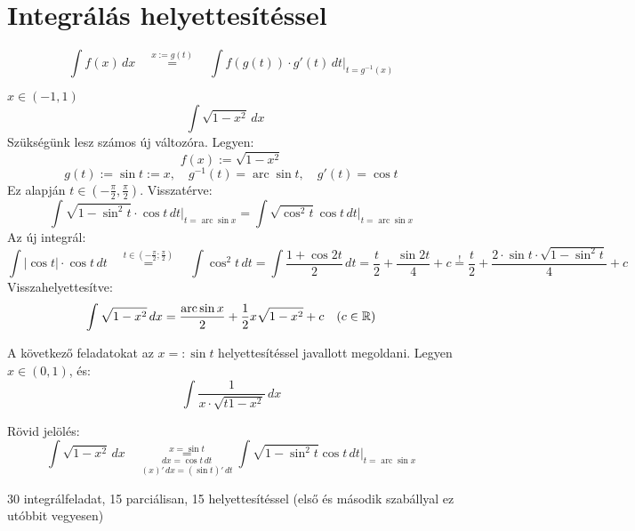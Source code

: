 \documentclass[a4paper,11.5pt]{article}
\DeclareMathOperator{\arc}{arc}
\begin{document}
	\section{Integrálás helyettesítéssel}
	\begin{revision}
		\[ \int f(x)\,dx\quad \overset{x:=g(t)}{=}\quad \int f(g(t))\cdot g'(t)\,dt\big|_{t=g^{-1}(x)} \]
	\end{revision}
	\begin{task}$x\in(-1,1)$
		\[\int\sqrt{1-x^2}\,dx \quad\]
		Szükségünk lesz számos új változóra. Legyen:
		\[ f(x):=\sqrt{1-x^2} \]
		\[ g(t) := \sin t := x,\quad g^{-1}(t) = \arc\sin t,\quad g'(t) = \cos t \]
		Ez alapján $t\in\left(-\frac{\pi}{2},\frac{\pi}{2} \right)$. Visszatérve:
		\[\int\sqrt{1-\sin^2t}\cdot\cos t\,dt\big|_{t=\arc\sin x}=\int\sqrt{\cos^2t}\cos t\,dt\big|_{t=\arc\sin x} \]
		Az új integrál:
		\[ \int|\cos t|\cdot\cos t\,dt\quad \overset{t\in\left(-\frac{\pi}{2};\frac{\pi}{2}\right)}{=}\quad \int\cos^2t\,dt=\int\frac{1+\cos2t}{2}\,dt=\frac{t}{2}+\frac{\sin2t}{4}+c \overset{!}{=} \frac{t}{2}+\frac{2\cdot\sin t\cdot\sqrt{1-\sin^2t}}{4}+c \]
		Visszahelyettesítve:
		\[ \int\sqrt{1-x^2}\,dx=\frac{\arc\sin x}{2}+\frac{1}{2}x\sqrt{1-x^2}+c\quad (c\in\R) \] 
	\end{task}
	
	\begin{exercise}A következő feladatokat az $x=:\sin t$ helyettesítéssel javallott megoldani. Legyen $x\in(0,1)$, és:
		\[ \int\frac{1}{x\cdot\sqrt{t1-x^2}}\,dx \]
	\end{exercise}
	\begin{note}
		Rövid jelölés:
		\[ \int\sqrt{1-x^2}\,dx\quad \overset{x=\sin t}{\underset{(x)'\,dx=(\sin t)'\,dt}{\underset{dx=\cos t\,dt}{=}}}\int\sqrt{1-\sin^2 t}\cos t\,dt\big|_{t=\arc\sin x} \]
	\end{note}
	\begin{exercise}
		30 integrálfeladat, 15 parciálisan, 15 helyettesítéssel (első és második szabállyal ez utóbbit vegyesen)
	\end{exercise}
\end{document}

